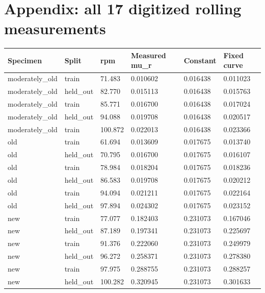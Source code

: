 \documentclass[10pt,a4paper]{article}
\begin{document}
\section*{Appendix: all 17 digitized rolling measurements}
\begin{center}\footnotesize\setlength{\tabcolsep}{4pt}
\begin{tabular}{llllll}
\hline
Specimen & Split & rpm & Measured mu\_r & Constant & Fixed curve\\\hline
moderately\_old & train & 71.483 & 0.010602 & 0.016438 & 0.011023\\
moderately\_old & held\_out & 82.770 & 0.015113 & 0.016438 & 0.015763\\
moderately\_old & train & 85.771 & 0.016700 & 0.016438 & 0.017024\\
moderately\_old & held\_out & 94.088 & 0.019708 & 0.016438 & 0.020517\\
moderately\_old & train & 100.872 & 0.022013 & 0.016438 & 0.023366\\
old & train & 61.694 & 0.013609 & 0.017675 & 0.013740\\
old & held\_out & 70.795 & 0.016700 & 0.017675 & 0.016107\\
old & train & 78.984 & 0.018204 & 0.017675 & 0.018236\\
old & held\_out & 86.583 & 0.019708 & 0.017675 & 0.020212\\
old & train & 94.094 & 0.021211 & 0.017675 & 0.022164\\
old & held\_out & 97.894 & 0.024302 & 0.017675 & 0.023152\\
new & train & 77.077 & 0.182403 & 0.231073 & 0.167046\\
new & held\_out & 87.189 & 0.197341 & 0.231073 & 0.225697\\
new & train & 91.376 & 0.222060 & 0.231073 & 0.249979\\
new & held\_out & 96.272 & 0.258371 & 0.231073 & 0.278380\\
new & train & 97.975 & 0.288755 & 0.231073 & 0.288257\\
new & held\_out & 100.282 & 0.320945 & 0.231073 & 0.301633\\
\hline\end{tabular}\end{center}
\end{document}
